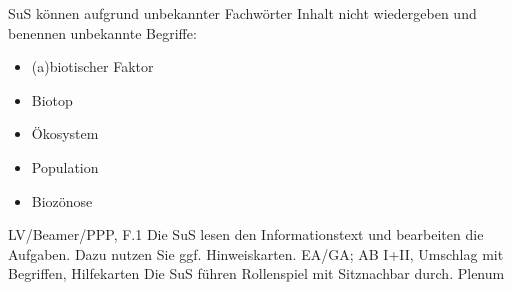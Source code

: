 \renewcommand{\labelitemi}{--}
\setlength{\tabcolsep}{1em}
%
\begin{uvp}      
       		{SuS können aufgrund unbekannter Fachwörter Inhalt nicht wiedergeben und benennen unbekannte Begriffe:
       			\begin{itemize}
       				\item (a)biotischer Faktor
       				\item Biotop
       				\item Ökosystem
       				\item Population
       				\item Biozönose
       			\end{itemize}}
       		{LV/Beamer/PPP, F.1}%
       		{Die SuS lesen den Informationstext und bearbeiten die Aufgaben. Dazu nutzen Sie ggf. Hinweiskarten.}%
       		{EA/GA; \newline AB I+II, Umschlag mit Begriffen, Hilfekarten}%
       		{Die SuS führen Rollenspiel mit Sitznachbar durch.}%
       		{Plenum}%
\end{uvp}

